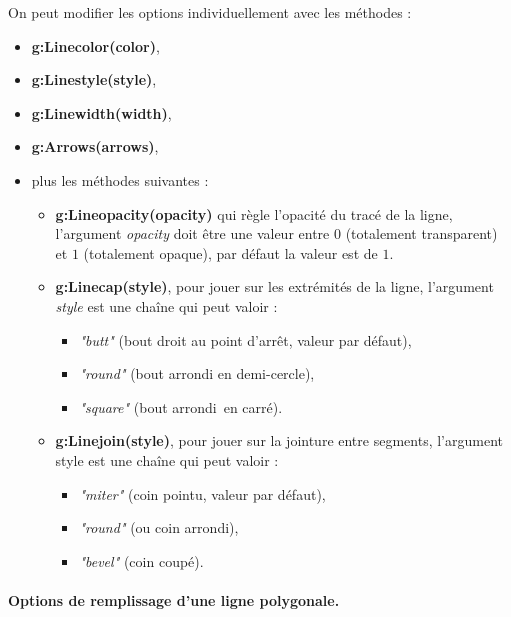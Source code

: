 \documentclass[%
10pt,%
a4paper,%
french,%
]%
{article}%
\begin{document}
On peut modifier les options individuellement avec les méthodes : 
\begin{itemize}
    \item \textbf{g:Linecolor(color)}, 
    \item \textbf{g:Linestyle(style)}, 
    \item \textbf{g:Linewidth(width)}, 
    \item \textbf{g:Arrows(arrows)}, 
    \item plus les méthodes suivantes : 
        \begin{itemize}
            \item \textbf{g:Lineopacity(opacity)} qui règle l'opacité du tracé de la ligne, l'argument \emph{opacity} doit être une
valeur entre $0$ (totalement transparent) et $1$ (totalement opaque), par défaut la valeur est de $1$.
            \item \textbf{g:Linecap(style)}, pour jouer sur les extrémités de la ligne, l'argument \emph{style} est une chaîne qui peut valoir :
            \begin{itemize}
                \item \emph{"butt"} (bout droit au point d'arrêt, valeur par défaut),
                \item \emph{"round"} (bout arrondi en demi-cercle),
                \item \emph{"square"} (bout \og arrondi\fg\ en carré).
            \end{itemize}
          
          \item \textbf{g:Linejoin(style)}, pour jouer sur la jointure entre segments, l'argument style est une chaîne qui peut valoir :
            \begin{itemize}
                \item \emph{"miter"} (coin pointu, valeur par défaut),
                \item \emph{"round"} (ou coin arrondi),
                \item \emph{"bevel"} (coin coupé).
            \end{itemize}
        \end{itemize}
\end{itemize}


\paragraph{Options de remplissage d'une ligne polygonale.}
\end{document}
